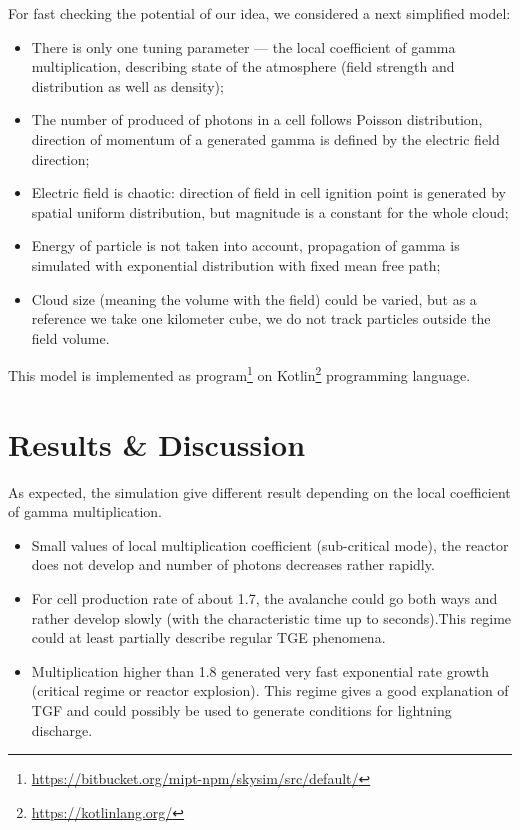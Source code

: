 \documentclass[%
 aip,
cp,  %
 amsmath,amssymb,%
 reprint,%
]{revtex4-2}
\begin{document}
For fast checking the potential of our idea, we considered a next simplified model:  
\begin{itemize}
	\item There is only one tuning parameter --- the local coefficient of gamma multiplication, describing state of the atmosphere (field strength and distribution as well as density);
	\item The number of produced of photons in a cell follows Poisson distribution, direction of momentum of a generated gamma is defined by the electric field direction;
	\item Electric field is chaotic: direction of field in cell ignition point is generated by spatial uniform distribution, but magnitude is a constant for the whole cloud;
	\item Energy of particle is not taken into account, propagation of gamma is simulated with exponential distribution with fixed mean free path;
	\item Cloud size (meaning the volume with the field) could be varied, but as a reference we take one kilometer cube, we do not track particles outside the field volume. 
\end{itemize}
This model is implemented as program\footnote{\url{https://bitbucket.org/mipt-npm/skysim/src/default/}}  on Kotlin\footnote{\url{https://kotlinlang.org/}} programming language. %

\section{Results \& Discussion}

As expected, the simulation give different result depending on the local coefficient of gamma multiplication. 
\begin{itemize}
    \item Small values of local multiplication coefficient (sub-critical mode), the reactor does not develop and number of photons decreases rather rapidly.
    \item For cell production rate of about 1.7, the avalanche could go both ways and rather develop slowly (with the characteristic time up to seconds).This regime could at least partially describe regular TGE phenomena.
    \item Multiplication higher than 1.8 generated very fast exponential rate growth (critical regime or reactor explosion). This regime gives a good explanation of TGF and could possibly be used to generate conditions for lightning discharge.
\end{itemize}
\end{document}
